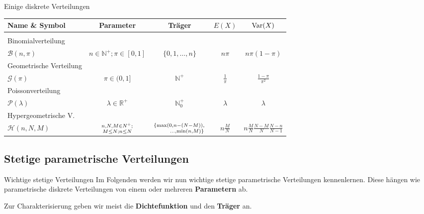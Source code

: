\documentclass[
  10pt,
  ignorenonframetext,
]{beamer}
\begin{document}
\begin{frame}{Einige diskrete Verteilungen}
\label{einige-diskrete-verteilungen}
\small
\begin{center}
\begin{tabular}{l|c c c c}
Name \& Symbol 
& Parameter
& Träger
& $E(X)$
& $\operatorname{Var}(X)$ \\
\hline
\\
Binomialverteilung\\
$ {\mathcal B}(n, \pi)$
& $n \in \mathbb N^+; \pi \in [0,1]$
& $\{0, 1, \dots, n\}$
& $n \pi$
& $n \pi (1 - \pi)$\\[1.5em]

Geometrische Verteilung\\
$ \mathcal{G}(\pi) $
& $\pi \in (0,1]$
& $\mathbb N^+$ 
& $\frac{1}{\pi}$
& $\frac{1 - \pi}{\pi^2}$\\[1.5em]

Poissonverteilung\\
$\mathcal{P}(\lambda)$
& $\lambda \in \mathbb R^+$
& $\mathbb N^+_0$ 
& $\lambda$
& $\lambda$\\[1.5em]

Hypergeometrische V. \\
$\mathcal{H}(n, N, M)$
& { ${n, N, M \in N^+;}\atop{M \leq N; n \leq N}$}
& { ${\left\{\max\left(0, n - (N - M)\right),\right.}\atop{\qquad\left. ..., \min\left(n, M\right)\right\}}$}
& $n\tfrac{M}{N}$
& $n\tfrac{M}{N}\tfrac{N-M}{N}\tfrac{N-n}{N-1}$\\[1.5em]

\end{tabular}
\end{center}
\end{frame}

\subsection{Stetige parametrische
Verteilungen}\label{stetige-parametrische-verteilungen}

\begin{frame}{Wichtige stetige Verteilungen}
\label{wichtige-stetige-verteilungen}
Im Folgenden werden wir nun wichtige stetige parametrische Verteilungen
kennenlernen. Diese hängen wie parametrische diskrete Verteilungen von
einem oder mehreren \textbf{Parametern} ab.

Zur Charakterisierung geben wir meist die \textbf{Dichtefunktion} und
den \textbf{Träger} an.
\end{frame}
\end{document}
